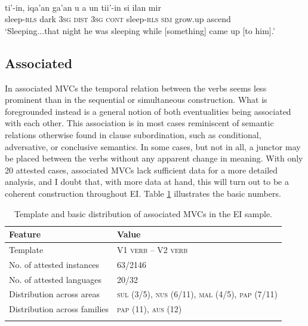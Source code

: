 \ea \label{}
\\
\gll ti'-in, iqa'an ga'an u a un tii'-in si ilan mir \\
sleep-\textsc{rls} dark 3\textsc{sg} \textsc{dist} 3\textsc{sg} \textsc{cont} sleep-\textsc{rls} \textsc{sim} grow.up ascend \\
\glft `Sleeping...that night he was sleeping while [something] came up [to him].'\\ 
\z

\subsection{Associated}

In associated MVCs the temporal relation between the verbs seems less prominent than in the sequential or simultaneous construction. What is foregrounded instead is a general notion of both eventualities being associated with each other. This association is in most cases reminiscent of semantic relations otherwise found in clause subordination, such as conditional, adversative, or conclusive semantics. In some cases, but not in all, a junctor may be placed between the verbs without any apparent change in meaning. With only 20 attested cases, associated MVCs lack sufficient data for a more detailed analysis, and I doubt that, with more data at hand, this will turn out to be a coherent construction throughout EI. Table \ref{table:associated} illustrates the basic numbers.

\begin{table}
\begin{tabular}{ll}
\lsptoprule
Feature&Value\tabularnewline
\hline
Template& V1 \textsc{verb} -- V2 \textsc{verb}\tabularnewline
No. of attested instances& 63/2146 \tabularnewline
No. of attested languages& 20/32 \tabularnewline
Distribution across areas& \textsc{sul} (3/5), \textsc{nus} (6/11), \textsc{mal} (4/5), \textsc{pap} (7/11) \tabularnewline
Distribution across families& \textsc{pap} (11), \textsc{aus} (12) \tabularnewline
\lspbottomrule
\end{tabular}
\caption[Template and basic distribution of associated MVCs]{Template and basic distribution of associated MVCs in the EI sample.}
\label{table:associated}
\end{table}

